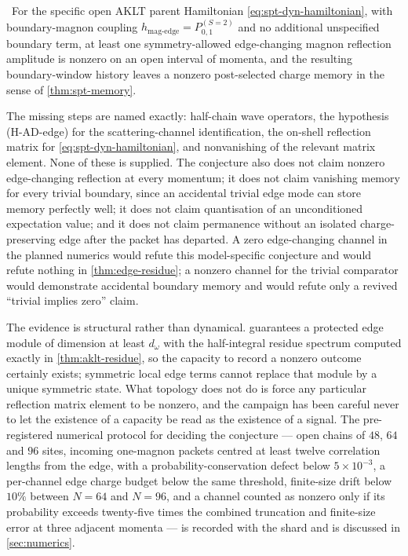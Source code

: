 
\begin{conjecture}\label{conj:spt-dyn}
\statusConjecture\ For the specific open AKLT parent Hamiltonian
\eqref{eq:spt-dyn-hamiltonian}, with boundary-magnon coupling
$h_{\mathrm{mag\text{-}edge}}=P^{(S=2)}_{0,1}$ and no additional unspecified
boundary term, at least one symmetry-allowed edge-changing magnon reflection
amplitude is nonzero on an open interval of momenta, and the resulting
boundary-window history leaves a nonzero post-selected charge memory in the
sense of \cref{thm:spt-memory}.
\end{conjecture}

\begin{scope}
The missing steps are named exactly: half-chain wave operators, the hypothesis
(H-AD-edge) for the scattering-channel identification, the on-shell reflection
matrix for \eqref{eq:spt-dyn-hamiltonian}, and nonvanishing of the relevant
matrix element. None of these is supplied. The conjecture also does not claim
nonzero edge-changing reflection at every momentum; it does not claim vanishing
memory for every trivial boundary, since an accidental trivial edge mode can
store memory perfectly well; it does not claim quantisation of an
unconditioned expectation value; and it does not claim permanence without an
isolated charge-preserving edge after the packet has departed. A zero
edge-changing channel in the planned numerics would refute this
model-specific conjecture and would refute nothing in
\cref{thm:edge-residue}; a nonzero channel for the trivial comparator would
demonstrate accidental boundary memory and would refute only a revived
``trivial implies zero'' claim.
\end{scope}

The evidence is structural rather than dynamical. 
guarantees a protected edge module of dimension at least $d_\omega$ with the
half-integral residue spectrum computed exactly in \cref{thm:aklt-residue}, so
the capacity to record a nonzero outcome certainly exists; symmetric local
edge terms cannot replace that module by a unique symmetric state. What
topology does not do is force any particular reflection matrix element to be
nonzero, and the campaign has been careful never to let the existence of a
capacity be read as the existence of a signal. The pre-registered numerical
protocol for deciding the conjecture --- open chains of $48$, $64$ and $96$
sites, incoming one-magnon packets centred at least twelve correlation lengths
from the edge, with a probability-conservation defect below $5\times10^{-3}$, a
per-channel edge charge budget below the same threshold, finite-size drift
below $10\%$ between $N=64$ and $N=96$, and a channel counted as nonzero only
if its probability exceeds twenty-five times the combined truncation and
finite-size error at three adjacent momenta --- is recorded with the shard and
is discussed in \cref{sec:numerics}.

